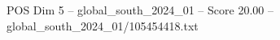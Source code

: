 \begin{textsample}{POS Dim 5 – global\_south\_2024\_01 – Score 20.00 – global\_south\_2024\_01/105454418.txt}
\end{textsample}
